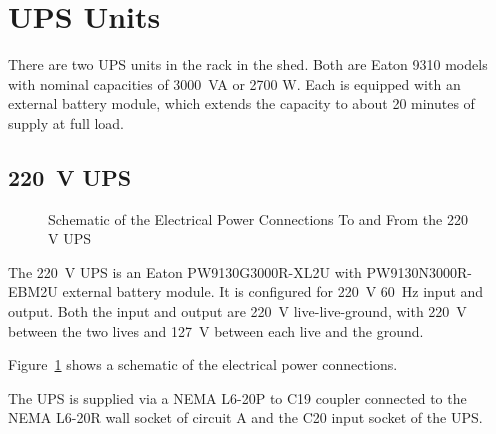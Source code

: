 \section{UPS Units}

There are two UPS units in the rack in the shed. Both are Eaton 9310 models with nominal capacities of 3000~VA or 2700 W. Each is equipped with an external battery module, which extends the capacity to about 20 minutes of supply at full load.

\subsection{220~V UPS}

\begin{figure}
\begin{center}
\footnotesize 
{}
\end{center}
\caption{Schematic of the Electrical Power Connections To and From the 220 V UPS}
\label{figure:schematic-electrical-power-box-ups-220}
\end{figure}

The 220~V UPS is an Eaton PW9130G3000R-XL2U with PW9130N3000R-EBM2U external battery module. It is configured for 220~V 60~Hz input and output. Both the input and output are 220~V live-live-ground, with 220~V between the two lives and 127~V between each live and the ground.

Figure~\ref{figure:schematic-electrical-power-box-ups-220} shows a schematic of the electrical power connections.

The UPS is supplied via a NEMA L6-20P to C19 coupler connected to the NEMA L6-20R wall socket of circuit A and the C20 input socket of the UPS.

